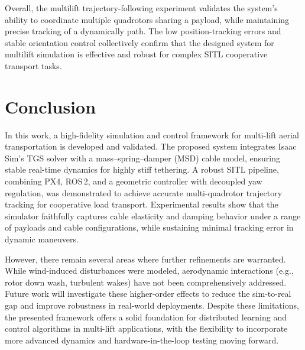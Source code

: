 \documentclass[12pt,twoside,letterpaper]{article}
\begin{document}
Overall, the multilift trajectory-following experiment validates the system’s ability to coordinate multiple quadrotors sharing a payload, while maintaining precise tracking of a dynamically path. The low position-tracking errors and stable orientation control collectively confirm that the designed system for multilift simulation is effective and robust for complex SITL cooperative transport tasks.

\newpage
\section{Conclusion}

In this work, a high-fidelity simulation and control framework for multi-lift aerial transportation is developed and validated. The proposed system integrates Isaac Sim’s TGS solver with a mass–spring–damper (MSD) cable model, ensuring stable real-time dynamics for highly stiff tethering. A robust SITL pipeline, combining PX4, ROS\,2, and a geometric controller with decoupled yaw regulation, was demonstrated to achieve accurate multi-quadrotor trajectory tracking for cooperative load transport. Experimental results show that the simulator faithfully captures cable elasticity and damping behavior under a range of payloads and cable configurations, while sustaining minimal tracking error in dynamic maneuvers.

However, there remain several areas where further refinements are warranted. While wind-induced disturbances were modeled, aerodynamic interactions (e.g., rotor down wash, turbulent wakes) have not been comprehensively addressed. Future work will investigate these higher-order effects to reduce the sim-to-real gap and improve robustness in real-world deployments. Despite these limitations, the presented framework offers a solid foundation for distributed learning and control algorithms in multi-lift applications, with the flexibility to incorporate more advanced dynamics and hardware-in-the-loop testing moving forward.



\newpage
{}


\newpage
\end{document}
